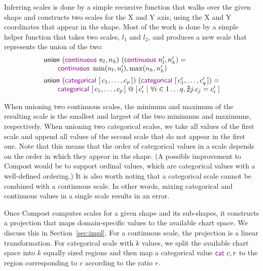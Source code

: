 \documentclass{jfp}
\newcommand{\ident}[1]{\textnormal{\textcolor{idclr}{\sffamily #1}}}
\newcommand{\kvd}[1]{\textnormal{\textcolor{kvdclr}{\sffamily #1}}}
\begin{document}
Inferring scales is done by a simple recursive function that walks over the given shape and
constructs two scales for the X and Y axis, using the X and Y coordinates that appear in the shape.
Most of the work is done by a simple helper function that takes two scales, $l_1$ and $l_2$,
and produces a new scale that represents the union of the two:
%
\begin{equation*}
\begin{array}{l}
\ident{union}~(\kvd{continuous}~n_l, n_h)~(\kvd{continuous}~n'_l, n'_h) =\\
\qquad\kvd{continuous}~\min(n_l, n'_l), \max(n_h, n'_h)\\[0.5em]
\ident{union}~(\kvd{categorical}~[\,c_1, \ldots, c_p\,])~(\kvd{categorical}~[\,c'_1, \ldots, c'_q\,]) =\\
\qquad \kvd{categorical}~[\,c_1, \ldots, c_p\,] \;@\; [\,c'_i~|~ \forall i\in 1\ldots q, \nexists j. c_j = c'_i \;]
\end{array}
\end{equation*}

\vspace{-0.5em}
\noindent
When unioning two continuous scales, the minimum and maximum of the resulting scale is the smallest
and largest of the two minimums and maximums, respectively. When unioning two categorical scales,
we take all values of the first scale and append all values of the second scale that do not appear
in the first one. Note that this means that the order of categorical values in a scale depends on
the order in which they appear in the shape. (A possible improvement to Compost would be to support
ordinal values, which are categorical values with a well-defined ordering.) It is also worth noting
that a categorical scale cannot be combined with a continuous scale. In other words, mixing
categorical and continuous values in a single scale results in an error.

Once Compost computes scales for a given shape and its sub-shapes, it constructs a projection
that maps domain-specific values to the available chart space. We discuss this in
Section~\ref{sec:impl}. For a continuous scale, the projection is a linear transformation. For
categorical scale with $k$ values, we split the available chart space into $k$ equally sized
regions and then map a categorical value $\kvd{cat}~c, r$ to the region corresponding to $c$
according to the ratio $r$.
\end{document}
